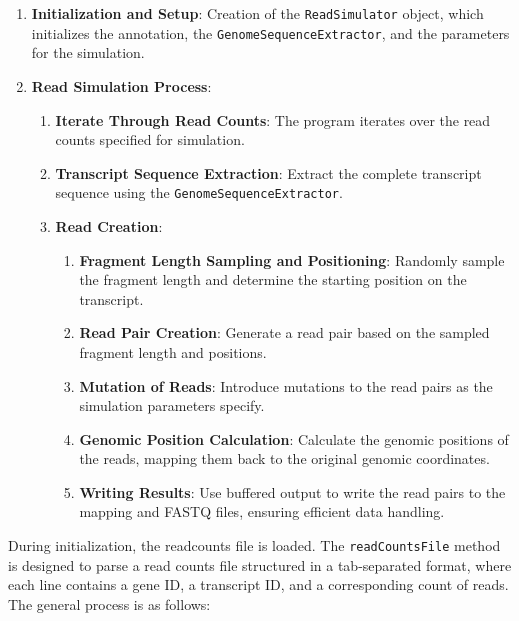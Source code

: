 \documentclass{article}
\begin{document}
    \begin{enumerate}
        \item \textbf{Initialization and Setup}: Creation of the \texttt{ReadSimulator} object, which initializes the annotation, the \texttt{GenomeSequenceExtractor}, and the parameters for the simulation.
        \item \textbf{Read Simulation Process}:
        \begin{enumerate}
            \item \textbf{Iterate Through Read Counts}: The program iterates over the read counts specified for simulation.
            \item \textbf{Transcript Sequence Extraction}: Extract the complete transcript sequence using the \texttt{GenomeSequenceExtractor}.
            \item \textbf{Read Creation}:
            \begin{enumerate}
                \item \textbf{Fragment Length Sampling and Positioning}: Randomly sample the fragment length and determine the starting position on the transcript.
                \item \textbf{Read Pair Creation}: Generate a read pair based on the sampled fragment length and positions.
                \item \textbf{Mutation of Reads}: Introduce mutations to the read pairs as the simulation parameters specify.
                \item \textbf{Genomic Position Calculation}: Calculate the genomic positions of the reads, mapping them back to the original genomic coordinates.
                \item \textbf{Writing Results}: Use buffered output to write the read pairs to the mapping and FASTQ files, ensuring efficient data handling.
            \end{enumerate}
        \end{enumerate}
    \end{enumerate}
    During initialization, the readcounts file is loaded. The \texttt{readCountsFile} method is designed to parse a read counts file structured in a tab-separated format, where each line contains a gene ID, a transcript ID, and a corresponding count of reads. The general process is as follows:
\end{document}
